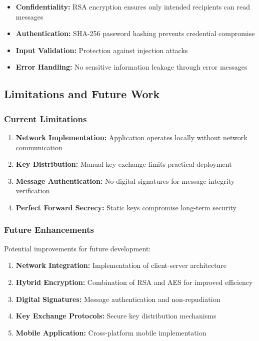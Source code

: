 \documentclass[12pt,a4paper]{article}
\begin{document}
\begin{itemize}
    \item \textbf{Confidentiality:} RSA encryption ensures only intended recipients can read messages
    \item \textbf{Authentication:} SHA-256 password hashing prevents credential compromise
    \item \textbf{Input Validation:} Protection against injection attacks
    \item \textbf{Error Handling:} No sensitive information leakage through error messages
\end{itemize}

\subsection{Limitations and Future Work}

\subsubsection{Current Limitations}

\begin{enumerate}
    \item \textbf{Network Implementation:} Application operates locally without network communication
    \item \textbf{Key Distribution:} Manual key exchange limits practical deployment
    \item \textbf{Message Authentication:} No digital signatures for message integrity verification
    \item \textbf{Perfect Forward Secrecy:} Static keys compromise long-term security
\end{enumerate}

\subsubsection{Future Enhancements}

Potential improvements for future development:

\begin{enumerate}
    \item \textbf{Network Integration:} Implementation of client-server architecture
    \item \textbf{Hybrid Encryption:} Combination of RSA and AES for improved efficiency
    \item \textbf{Digital Signatures:} Message authentication and non-repudiation
    \item \textbf{Key Exchange Protocols:} Secure key distribution mechanisms
    \item \textbf{Mobile Application:} Cross-platform mobile implementation
\end{enumerate}
\end{document}

